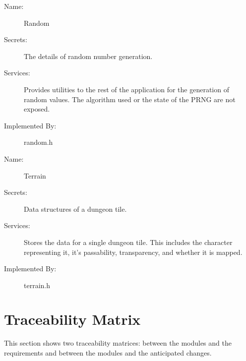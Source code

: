 \documentclass[12pt, titlepage]{article}
\newcommand{\newSection}[1]{
  \newpage
  \section{#1}
}
\begin{document}
        \bigskip\begin{description}
            \item[Name:]Random
            \item[Secrets:]The details of random number generation.
            \item[Services:]Provides utilities to the rest of the application for the generation of random
            values. The algorithm used or the state of the PRNG are not exposed.
            \item[Implemented By:] random.h
        \end{description}

        \bigskip\begin{description}
            \item[Name:]Terrain
            \item[Secrets:]Data structures of a dungeon tile.
            \item[Services:]Stores the data for a single dungeon tile. This includes the character representing it, it's passability, transparency, and whether it is mapped.
            \item[Implemented By:]terrain.h
        \end{description}

\newSection{Traceability Matrix} \label{SecTM}

    This section shows two traceability matrices: between the modules and the
    requirements and between the modules and the anticipated changes.
\end{document}
